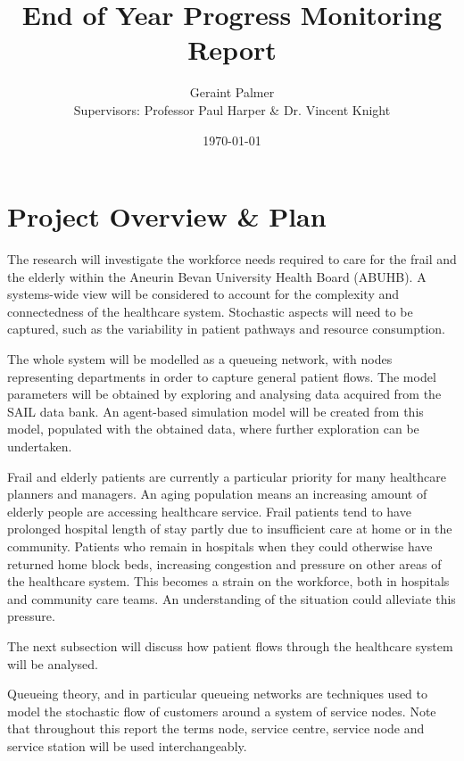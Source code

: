 \documentclass{article}
\title{End of Year Progress Monitoring Report}
\author{Geraint Palmer\\{\small Supervisors: Professor Paul Harper \& Dr. Vincent Knight}}
\date{\today}
\begin{document}
\onehalfspacing

\maketitle




\section{Project Overview \& Plan}

The research will investigate the workforce needs required to care for the frail and the elderly within the Aneurin Bevan University Health Board (ABUHB).
A systems-wide view will be considered to account for the complexity and connectedness of the healthcare system.
Stochastic aspects will need to be captured, such as the variability in patient pathways and resource consumption.

The whole system will be modelled as a queueing network, with nodes representing departments in order to capture general patient flows.
The model parameters will be obtained by exploring and analysing data acquired from the SAIL data bank.
An agent-based simulation model will be created from this model, populated with
the obtained data, where further exploration can be undertaken.

Frail and elderly patients are currently a particular priority for many healthcare planners and managers.
An aging population means an increasing amount of elderly people are accessing healthcare service.
Frail patients tend to have prolonged hospital length of stay partly due to insufficient care at home or in the community.
Patients who remain in hospitals when they could otherwise have returned home block beds, increasing congestion and pressure on other areas of the healthcare system.
This becomes a strain on the workforce, both in hospitals and community care teams.
An understanding of the situation could alleviate this pressure.

The next subsection will discuss how patient flows through the healthcare system will be analysed.


Queueing theory, and in particular queueing networks are techniques used to model the stochastic flow of customers around a system of service nodes.
Note that throughout this report the terms node, service centre, service node and service station will be used interchangeably.
\end{document}
